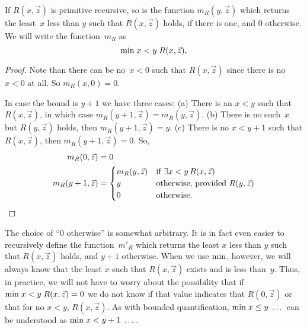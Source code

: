 \documentclass[../../include/open-logic-section]{subfiles}
\begin{document}


\begin{prop}
If $R(x, \vec z)$ is primitive recursive, so is the function $m_R(y,
\vec{z})$ which returns the least~$x$ less than $y$ such that
$R(x,\vec{z})$ holds, if there is one, and 0 otherwise.  We will write
the function~$m_R$ as
\[
\mathrm{min} \; x < y \; R(x, \vec{z}),
\]
\end{prop}

\begin{proof}
Note than there can be no~$x < 0$ such that $R(x, \vec{z})$ since
there is no $x < 0$ at all.  So $m_R(x, 0) = 0$.

In case the bound is $y + 1$ we have three cases: (a) There is an $x <
y$ such that $R(x, \vec{z})$, in which case $m_R(y+1, \vec{z}) =
m_R(y, \vec{z})$. (b) There is no such~$x$ but $R(y, \vec{z})$ holds, then
$m_R(y+1, \vec{z}) = y$. (c) There is no $x < y+1$ such that $R(x,
\vec{z})$, then $m_R(y+1,\vec{z}) = 0$. So,
\begin{align*}
m_R(0, \vec{z}) & = 0\\
m_R(y+1, \vec{z}) & =
\begin{cases}
m_R(y, \vec{z}) & \text{if $\lexists[x < y][R(x, \vec{z})]$} \\
y & \text{otherwise, provided $R(y, \vec{z})$}\\
0 & \text{otherwise.}
\end{cases}
\end{align*}
\end{proof}

\begin{explain}
The choice of ``$0$ otherwise'' is somewhat arbitrary. It is in fact
even easier to recursively define the function~$m'_R$ which returns
the least $x$ less than $y$ such that $R(x,\vec z)$ holds, and $y+1$
otherwise.  When we use $\mathrm{min}$, however, we will always know that
the least $x$ such that $R(x, \vec z)$ exists and is less
than~$y$. Thus, in practice, we will not have to worry about the
possibility that if $\mathrm{min} \; x<y \; R(x, \vec{z}) = 0$ we do not know if that
value indicates that $R(0, \vec z)$ or that for no $x < y$, $R(x, \vec
z)$. As with bounded quantification, $\mathrm{min} \; x \leq y \; \dots$
can be understood as $\mathrm{min} \; x < y + 1 \; \dots$.
\end{explain}
\end{document}
